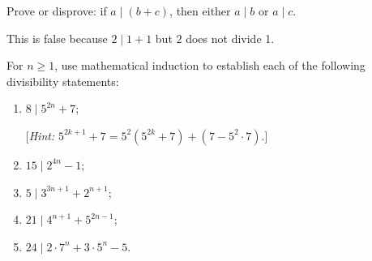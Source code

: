 \begin{exercise}
    Prove or disprove: if $a \mid (b+c)$, then either $a \mid b$ or $a \mid c$. \\
\end{exercise}

\begin{solution}
    This is false because $2 \mid 1 + 1$ but $2$ does not divide 1.\\
\end{solution}

\begin{exercise}
    For $n \geq 1$, use mathematical induction to establish each of the following divisibility statements:
    \begin{enumerate}
        \item $8 \mid 5^{2n} + 7$;
        
        [\textit{Hint:} $5^{2k+1} + 7 = 5^2(5^{2k} + 7) + (7 - 5^2 \cdot 7).$]
        \item $15 \mid 2^{4n} - 1$;
        \item $5 \mid 3^{3n+1} + 2^{n+1}$;
        \item $21 \mid 4^{n+1} + 5^{2n-1}$;
        \item $24 \mid 2\cdot 7^n + 3\cdot 5^n - 5$.
    \end{enumerate}
\end{exercise}


